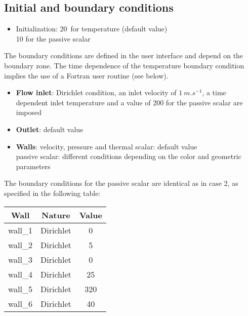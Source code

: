	\subsection{Initial and boundary conditions}

\begin{itemize}
\renewcommand{\labelitemi}{$\rightarrow$}
	\item Initialization: 20\degresC\ for temperature (default value) \\
	\hspace*{2.1cm}        10 for the passive scalar
\end{itemize}

The boundary conditions are defined in the user interface and depend on the
boundary zone. The time dependence of the temperature boundary condition implies
the use of a Fortran user routine (see below).

\begin{itemize}
	\item {\bfseries Flow inlet}: Dirichlet condition, an inlet velocity of
$1\ m.s^{-1}$, a time dependent inlet temperature and a value of 200 for the
passive scalar are imposed
	\item {\bfseries Outlet}: default value
	\item {\bfseries Walls}: velocity, pressure and thermal scalar: default value \\
	            \hspace*{1.25cm} passive scalar: different conditions
depending on the color and geometric parameters
\end{itemize}

The boundary conditions for the passive scalar are identical as in case 2,
as specified in the following table:

\begin{center}
\begin{tabular}{|c|c|c|}
\hline
Wall & Nature & Value \\
\hline 
wall\_1 & Dirichlet  & 0 \\ 
\hline 
wall\_2 & Dirichlet  & 5 \\ 
\hline 
wall\_3 & Dirichlet  & 0 \\ 
\hline 
wall\_4 & Dirichlet  & 25 \\ 
\hline 
wall\_5 & Dirichlet  & 320 \\ 
\hline 
wall\_6 & Dirichlet  & 40 \\ 
\hline
\end{tabular} 
\end{center}

